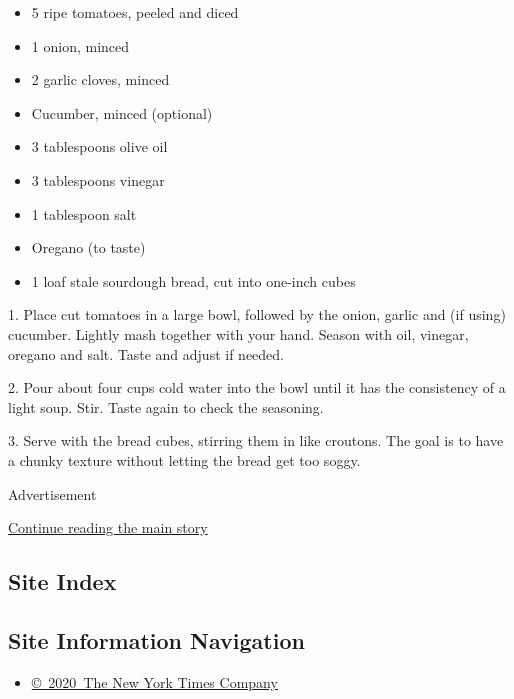 \begin{itemize}
\item
  5 ripe tomatoes, peeled and diced
\item
  1 onion, minced
\item
  2 garlic cloves, minced
\item
  Cucumber, minced (optional)
\item
  3 tablespoons olive oil
\item
  3 tablespoons vinegar
\item
  1 tablespoon salt
\item
  Oregano (to taste)
\item
  1 loaf stale sourdough bread, cut into one-inch cubes
\end{itemize}

1. Place cut tomatoes in a large bowl, followed by the onion, garlic and
(if using) cucumber. Lightly mash together with your hand. Season with
oil, vinegar, oregano and salt. Taste and adjust if needed.

2. Pour about four cups cold water into the bowl until it has the
consistency of a light soup. Stir. Taste again to check the seasoning.

3. Serve with the bread cubes, stirring them in like croutons. The goal
is to have a chunky texture without letting the bread get too soggy.

Advertisement

\protect\hyperlink{after-bottom}{Continue reading the main story}

\hypertarget{site-index}{%
\subsection{Site Index}\label{site-index}}

\hypertarget{site-information-navigation}{%
\subsection{Site Information
Navigation}\label{site-information-navigation}}

\begin{itemize}
\tightlist
\item
  \href{https://help.nytimes.com/hc/en-us/articles/115014792127-Copyright-notice}{©~2020~The
  New York Times Company}
\end{itemize}

